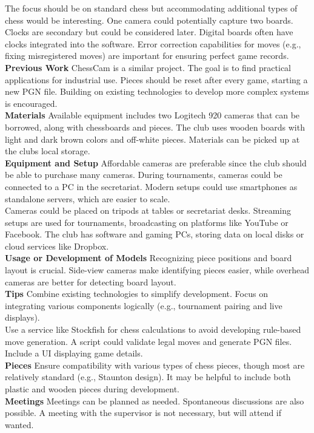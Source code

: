 The focus should be on standard chess but accommodating additional types of chess would be interesting. One camera could potentially capture two boards. Clocks are secondary but could be considered later. Digital boards often have clocks integrated into the software. Error correction capabilities for moves (e.g., fixing misregistered moves) are important for ensuring perfect game records.\\

\textbf{Previous Work} 
ChessCam is a similar project. The goal is to find practical applications for industrial use. Pieces should be reset after every game, starting a new PGN file. Building on existing technologies to develop more complex systems is encouraged.\\


\textbf{Materials} 
Available equipment includes two Logitech 920 cameras that can be borrowed, along with chessboards and pieces. The club uses wooden boards with light and dark brown colors and off-white pieces. Materials can be picked up at the clubs local storage. \\


\textbf{Equipment and Setup} 
Affordable cameras are preferable since the club should be able to purchase many cameras. During tournaments, cameras could be connected to a PC in the secretariat. Modern setups could use smartphones as standalone servers, which are easier to scale.\\

Cameras could be placed on tripods at tables or secretariat desks. Streaming setups are used for tournaments, broadcasting on platforms like YouTube or Facebook. The club has software and gaming PCs, storing data on local disks or cloud services like Dropbox.\\

\textbf{Usage or Development of Models} 
Recognizing piece positions and board layout is crucial. Side-view cameras make identifying pieces easier, while overhead cameras are better for detecting board layout.\\

\textbf{Tips} 
Combine existing technologies to simplify development. Focus on integrating various components logically (e.g., tournament pairing and live displays). \\

Use a service like Stockfish for chess calculations to avoid developing rule-based move generation. A script could validate legal moves and generate PGN files. Include a UI displaying game details.\\

\textbf{Pieces} 
Ensure compatibility with various types of chess pieces, though most are relatively standard (e.g., Staunton design). It may be helpful to include both plastic and wooden pieces during development.\\

\textbf{Meetings} 
Meetings can be planned as needed. Spontaneous discussions are also possible. A meeting with the supervisor is not necessary, but will attend if wanted.